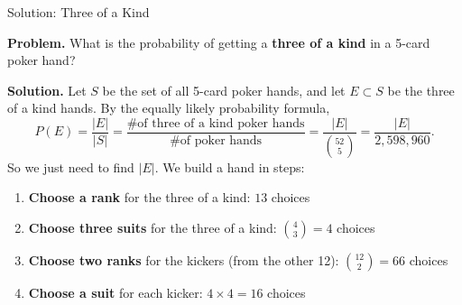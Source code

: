 \documentclass[10pt]{beamer}
\begin{document}
\begin{frame}[t]{Solution: Three of a Kind}
\footnotesize
\setlength{\abovedisplayskip}{2pt}
\setlength{\belowdisplayskip}{2pt}

\colorbox{blue!30}{\textbf{Problem.}} What is the probability of getting a \textbf{three of a kind} in a 5-card poker hand?

\colorbox{green!30}{\textbf{Solution.}} Let $S$ be the set of all 5-card poker hands, and let $E \subset S$ be the three of a kind hands.  By the equally likely probability formula,
\[
P(E) = \frac{|E|}{|S|} = \frac{\text{\# of three of a kind poker hands}}{\text{\# of poker hands}} = \frac{|E|}{\binom{52}{5}} = \frac{|E|}{2{,}598{,}960}.
\]
So we just need to find $|E|$.  We build a hand in steps:

\vspace{-0.1cm}
\begin{center}
\end{center}

\vspace{-0.5cm}
\begin{enumerate}\setlength{\itemsep}{0pt}
  \item<2-> \textbf{Choose a rank} for the three of a kind: \hfill $13$ choices
  \item<3-> \textbf{Choose three suits} for the three of a kind: \hfill $\binom{4}{3} = 4$ choices
  \item<4-> \textbf{Choose two ranks} for the kickers (from the other 12): \hfill $\binom{12}{2} = 66$ choices
  \item<5-> \textbf{Choose a suit} for each kicker: \hfill $4 \times 4 = 16$ choices
\end{enumerate}


\vspace{0.1cm}
\end{frame}
\end{document}
